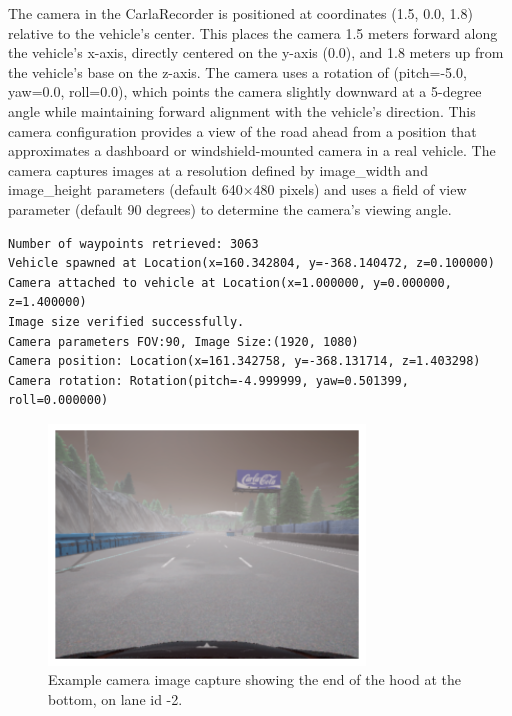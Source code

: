The camera in the CarlaRecorder is positioned at coordinates (1.5, 0.0, 1.8) relative to the vehicle's center. This places the camera 1.5 meters forward along the vehicle's x-axis, directly centered on the y-axis (0.0), and 1.8 meters up from the vehicle's base on the z-axis. The camera uses a rotation of (pitch=-5.0, yaw=0.0, roll=0.0), which points the camera slightly downward at a 5-degree angle while maintaining forward alignment with the vehicle's direction. This camera configuration provides a view of the road ahead from a position that approximates a dashboard or windshield-mounted camera in a real vehicle. The camera captures images at a resolution defined by image\_width and image\_height parameters (default 640×480 pixels) and uses a field of view parameter (default 90 degrees) to determine the camera's viewing angle.



\begin{verbatim}
Number of waypoints retrieved: 3063
Vehicle spawned at Location(x=160.342804, y=-368.140472, z=0.100000)
Camera attached to vehicle at Location(x=1.000000, y=0.000000, z=1.400000)
Image size verified successfully.
Camera parameters FOV:90, Image Size:(1920, 1080)
Camera position: Location(x=161.342758, y=-368.131714, z=1.403298)
Camera rotation: Rotation(pitch=-4.999999, yaw=0.501399, roll=0.000000)
\end{verbatim}


\begin{figure}[h]
    \centering
    \includegraphics[width=0.75\textwidth]{Figures/Methods/640x480_90_1.4_1.4_lane_id_minus_2.png}
    \caption{Example camera image capture showing the end of the hood at the bottom, on lane id -2.}
    \label{fig:/640x480_90_1.4_1.4_lane_id_minus_2}
\end{figure}

